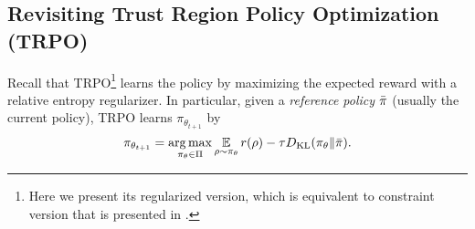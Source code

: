 \subsection{Revisiting Trust Region Policy Optimization (TRPO)}
\label{subsec:revisitTRPO}
Recall that TRPO\footnote{Here we present its regularized version, which is equivalent to constraint version that is presented in \citet{schulman2015trust}. } learns the policy by maximizing the expected reward with a relative entropy regularizer.
In particular, given a \emph{reference policy} $\bar{\pi}$ (usually the current policy), 
TRPO learns $\pi_{\theta_{t+1}} $ by 
\begin{equation}
\label{eq:max_expected_reward_plus_relative_entropy}
\pi_{\theta_{t+1}} = \operatorname*{arg\,max}\limits_{\pi_\theta \in \Pi} { \operatorname*{\mathbb{E}}\limits_{\rho \sim \pi_\theta}{  r(\rho)  - \tau D_{\mathrm{KL}}(\pi_\theta \| \bar{\pi}) } }.
\end{equation}

